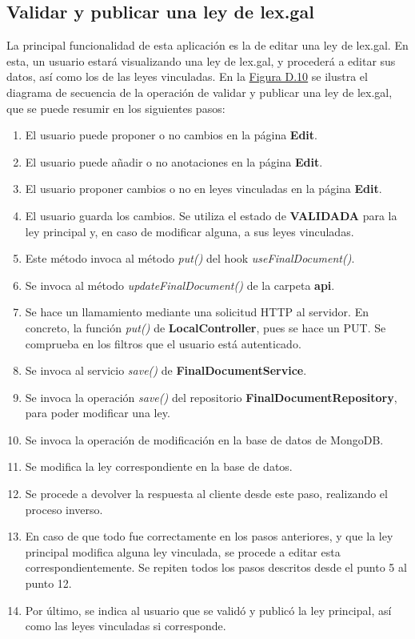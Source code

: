 \subsection{Validar y publicar una ley de lex.gal}

La principal funcionalidad de esta aplicación es la de editar una ley de lex.gal. En esta, un usuario estará visualizando una ley de lex.gal, y procederá a editar sus datos, así como los de las leyes vinculadas. En la \hyperref[enlaceDValidarLEXGAL]{Figura D.10} se ilustra el diagrama de secuencia de la operación de validar y publicar una ley de lex.gal, que se puede resumir en los siguientes pasos:

\begin{enumerate}
    \item El usuario puede proponer o no cambios en la página {\bf Edit}.
    \item El usuario puede añadir o no anotaciones en la página {\bf Edit}.
    \item El usuario proponer cambios o no en leyes vinculadas en la página {\bf Edit}.
    \item El usuario guarda los cambios. Se utiliza el estado de {\bf VALIDADA} para la ley principal y, en caso de modificar alguna, a sus leyes vinculadas.
    \item Este método invoca al método {\it put()} del hook {\it useFinalDocument()}.
    \item Se invoca al método {\it updateFinalDocument()} de la carpeta  {\bf api}.
    \item Se hace un llamamiento mediante una solicitud HTTP al servidor. En concreto, la función {\it put()} de {\bf LocalController}, pues se hace un PUT. Se comprueba en los filtros que el usuario está autenticado.
    \item Se invoca al servicio {\it save()} de {\bf FinalDocumentService}.
    \item Se invoca la operación {\it save()} del repositorio {\bf FinalDocumentRepository}, para poder modificar una ley.
    \item Se invoca la operación de modificación en la base de datos de MongoDB.
    \item Se modifica la ley correspondiente en la base de datos.
    \item Se procede a devolver la respuesta al cliente desde este paso, realizando el proceso inverso.
    \item En caso de que todo fue correctamente en los pasos anteriores, y que la ley principal modifica alguna ley vinculada, se procede a editar esta correspondientemente. Se repiten todos los pasos descritos desde el punto 5 al punto 12.
    \item Por último, se indica al usuario que se validó y publicó la ley principal, así como las leyes vinculadas si corresponde.
\end{enumerate}